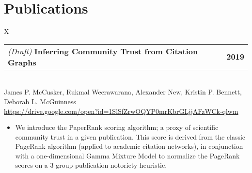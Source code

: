 \documentclass[10pt, letterpaper]{article}
\newcommand{\tabularxwidth}{\textwidth}
\begin{document}

    
        \section{Publications}

    
        \begin{minipage}{\tabularxwidth}
        \begin{tabularx}{\tabularxwidth}{X}
            {
                \begin{tabularx}{\tabularxwidth}{@{}X r}
                        \textit{(Draft) }
                    \textbf{Inferring Community Trust from Citation Graphs} &
                    \textbf{
        2019} \\
                \end{tabularx}
            } \\
            James P. McCusker, Rukmal Weerawarana, Alexander New, Kristin P. Bennett, Deborah L. McGuinness \\

            
            
                \url{https://drive.google.com/open?id=1SlSfZrwOQYP0mrKbrGLjjAFzWCk-qlwm} \\
            
            
        \end{tabularx}

        \begin{itemize}[noitemsep, topsep=3pt, parsep=0pt, partopsep=0pt]
            
                \item 
    We introduce the PaperRank scoring algorithm; a proxy of scientific community trust in a given publication. This score is derived from the classic PageRank algorithm (applied to academic citation networks), in conjunction with a one-dimensional Gamma Mixture Model to normalize the PageRank scores on a 3-group publication notoriety heuristic.
            

\end{itemize}
\end{minipage}
\end{document}
